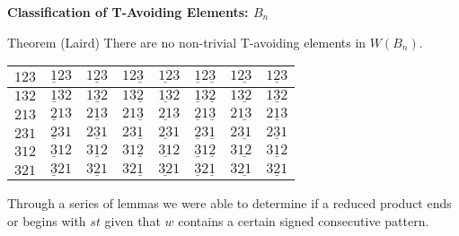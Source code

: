 \documentclass{beamer}
\begin{document}
\begin{frame}{\textbf{Classification of T-Avoiding Elements: $B_n$}}

\begin{block}{Theorem (Laird)}
	There are no non-trivial T-avoiding elements in $W(B_n)$.
\end{block}

\pause

\begin{center}
\begin{tabular}{|l|l|l|l|l|l|l|l|}
\hline
\cellcolor{blue!60}$123$ & \cellcolor{orange2!90}$\underline{1}23$ & \cellcolor{brown!90}$1\underline{2}3$ & \cellcolor{red!55}$12\underline{3}$ & \cellcolor{brown!90}$\underline{12}3$ & \cellcolor{red!55}$\underline{1}2\underline{3}$ & \cellcolor{turq!90}$1\underline{23}$ & \cellcolor{turq!90}$\underline{123}$ \\
\hline
\cellcolor{blue!60}$132$ & \cellcolor{orange2!90}$\underline{1}32$ & \cellcolor{brown!90}$1\underline{3}2$ & \cellcolor{red!55}$13\underline{2}$ & \cellcolor{brown!90}$\underline{13}2$ & \cellcolor{red!55}$\underline{1}3\underline{2}$ & \cellcolor{ggreen!90}$1\underline{32}$ & \cellcolor{ggreen!90}$\underline{132}$ \\
\hline
\cellcolor{blue!60}$213$ & \cellcolor{yellow!90}$\underline{2}13$ & \cellcolor{brown!90}$2\underline{1}3$ & \cellcolor{turq!90}$21\underline{3}$ & \cellcolor{yellow!90}$\underline{21}3$ & \cellcolor{red!55}$\underline{2}1\underline{3}$ & \cellcolor{turq!90}$2\underline{13}$ & \cellcolor{red!55}$\underline{213}$ \\
\hline
\cellcolor{red!55}$231$ & \cellcolor{purple2!70}$\underline{2}31$ & \cellcolor{ggreen!90}$2\underline{3}1$ & \cellcolor{red!55}$23\underline{1}$ & \cellcolor{brown!90}$\underline{23}1$ & \cellcolor{purple2!70}$\underline{2}3\underline{1}$ & \cellcolor{ggreen!90}$2\underline{31}$ & \cellcolor{brown!90}$\underline{231}$ \\
\hline
\cellcolor{ggreen!90}$312$ & \cellcolor{yellow!90}$\underline{3}12$ & \cellcolor{ggreen!90}$3\underline{1}2$ &\cellcolor{turq!90}$31\underline{2}$ & \cellcolor{yellow!90}$\underline{31}2$ & \cellcolor{yellow!90}$\underline{3}1\underline{2}$ & \cellcolor{turq!90}$3\underline{12}$ & \cellcolor{yellow!90}$\underline{312}$ \\
\hline
\cellcolor{turq!90}$321$ & \cellcolor{yellow!90}$\underline{3}21$ & \cellcolor{ggreen!90}$3\underline{2}1$ & \cellcolor{turq!90}$32\underline{1}$ & \cellcolor{yellow!90}$\underline{32}1$ & \cellcolor{yellow!90}$\underline{3}2\underline{1}$ & \cellcolor{ggreen!90}$3\underline{21}$ & \cellcolor{yellow!90}$\underline{321}$\\
\hline
\end{tabular}
\end{center}

Through a series of lemmas we were able to determine if a reduced product ends or begins with $st$ given that $w$ contains a certain signed consecutive pattern.

\end{frame}
\end{document}

